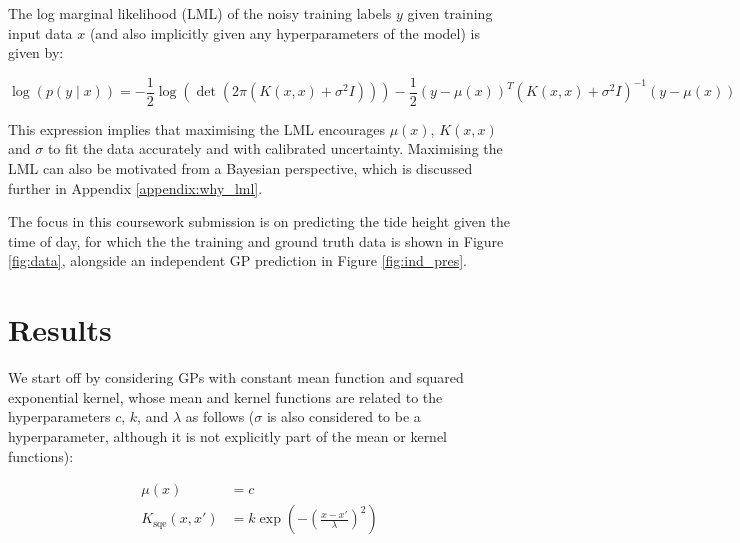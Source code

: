 \documentclass{article}
\begin{document}
The log marginal likelihood (LML) of the noisy training labels $y$ given training input data $x$ (and also implicitly given any hyperparameters of the model) is given by:


\begin{equation}
    \log \left( p(y \mid x) \right) = -\frac{1}{2}\log\left(\det \left(2\pi\left( K(x, x) + \sigma^2 I \right)\right)\right) -\frac{1}{2}(y - \mu(x))^T \left( K(x, x) + \sigma^2 I \right)^{-1} (y - \mu(x))
\end{equation}

This expression implies that maximising the LML encourages $\mu(x)$, $K(x,x)$ and $\sigma$ to fit the data accurately and with calibrated uncertainty. Maximising the LML can also be motivated from a Bayesian perspective, which is discussed further in Appendix \ref{appendix:why_lml}.

The focus in this coursework submission is on predicting the tide height given the time of day, for which the the training and ground truth data is shown in Figure \ref{fig:data}, alongside an independent GP prediction in Figure \ref{fig:ind_pres}.


\section{Results}

We start off by considering GPs with constant mean function and squared exponential kernel, whose mean and kernel functions are related to the hyperparameters $c$, $k$, and $\lambda$ as follows ($\sigma$ is also considered to be a hyperparameter, although it is not explicitly part of the mean or kernel functions):


\begin{align}
\mu(x) &= c \\
K_{\mathrm{sqe}}(x, x') &= k \exp\left( -\left( \frac{x - x'}{\lambda} \right)^2 \right)
\end{align}
\end{document}
